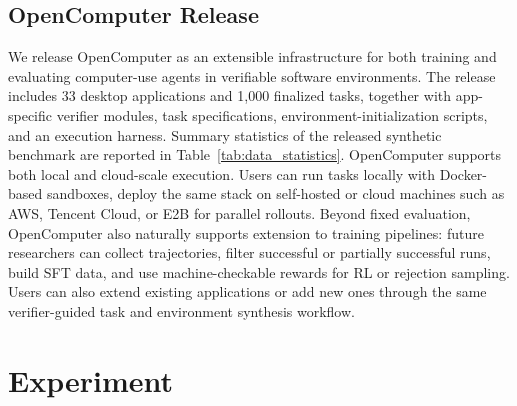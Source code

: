 \documentclass{llmxive}
\providecommand{\ours}{OpenComputer\xspace}
\begin{document}
\subsection{\ours Release}
We release \ours as an extensible infrastructure for both training and evaluating computer-use agents in verifiable software environments. The release includes 33 desktop applications and 1,000 finalized tasks, together with app-specific verifier modules, task specifications, environment-initialization
scripts, and an execution harness. Summary statistics of the released synthetic benchmark are reported in Table~\ref{tab:data_statistics}. \ours supports both local and cloud-scale execution. Users can run tasks locally with Docker-based sandboxes, deploy the same stack on self-hosted or cloud machines such as AWS, Tencent Cloud, or E2B for parallel rollouts. Beyond fixed evaluation, OpenComputer also naturally supports extension to training pipelines: future researchers can collect trajectories, filter successful or partially successful runs, build SFT data, and use machine-checkable rewards for RL or rejection sampling. Users can also extend existing applications or add new ones through the same verifier-guided task and environment synthesis workflow.
\section{Experiment}
\label{sec:experiment}
\end{document}
